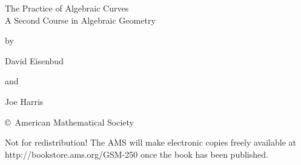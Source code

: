 \documentclass{article}
\begin{document}
\parindent0pt
\thispagestyle{empty}
\null
\vfil
\begin{centering}
\LARGE
The Practice of Algebraic Curves\\[10pt]

A Second Course in Algebraic Geometry

\vskip40pt

{\large by}

David Eisenbud

{\large and}

Joe Harris
\vskip40pt
\end{centering}

\vfil

\copyright \ American Mathematical Society
\vskip8pt

Not for redistribution! The AMS will make electronic copies freely
available at
http://bookstore.ams.org/GSM-250
once the book has been published.
\null
\end{document}
